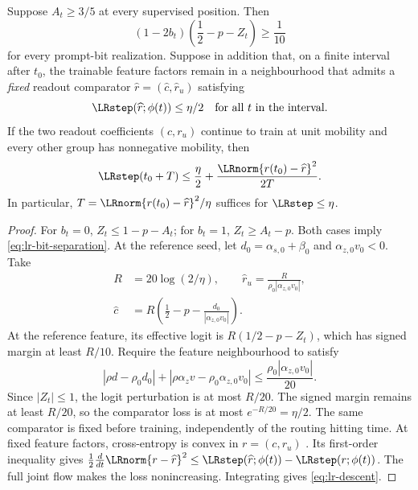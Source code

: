 \begin{lrlemma}
\label{lem:lr-readout-convergence}
Suppose $A_t\ge3/5$ at every supervised position.  Then
\begin{equation}\label{eq:lr-bit-separation}
 (1-2b_t)\left(\frac12-p-Z_t\right)\ge\frac1{10}
\end{equation}
for every prompt-bit realization.  Suppose in addition that, on a
finite interval after $t_0$, the trainable feature factors remain in a
neighbourhood that admits a \emph{fixed} readout comparator
$\widehat r=(\widehat c,\widehat r_u)$ satisfying
\begin{equation}\label{eq:lr-comparator}
 \LRstep(\widehat r;\phi(t))\le\eta/2
 \quad\text{for all }t\text{ in the interval}.
\end{equation}
If the two readout coefficients $(c,r_u)$ continue to train at unit
mobility and every other group has nonnegative mobility, then
\begin{equation}\label{eq:lr-descent}
 \LRstep(t_0+T)\le\frac\eta2+
 \frac{\LRnorm{r(t_0)-\widehat r}^2}{2T}.
\end{equation}
In particular, $T=\LRnorm{r(t_0)-\widehat r}^2/\eta$ suffices for
$\LRstep\le\eta$.
\end{lrlemma}
\begin{proof}
For $b_t=0$, $Z_t\le1-p-A_t$; for $b_t=1$,
$Z_t\ge A_t-p$.  Both cases imply
\eqref{eq:lr-bit-separation}.
At the reference seed, let $d_0=\alpha_{s,0}+\beta_0$ and $\alpha_{z,0}v_0<0$. Take
\[
 \begin{aligned}
 R&=20\log(2/\eta),\qquad \widehat r_u=\frac{R}{\rho_0|\alpha_{z,0}v_0|},\\
 \widehat c&=R\left(\frac12-p-\frac{d_0}{|\alpha_{z,0}v_0|}\right).
 \end{aligned}
\] 
At the reference feature, its effective logit is
$R(1/2-p-Z_t)$, which has signed margin at least $R/10$.
Require the feature neighbourhood to satisfy
\begin{equation}\label{eq:lr-comparator-stability}
 |\rho d-\rho_0d_0|+|\rho {\alpha_z v}-\rho_0{\alpha_{z,0}v_0}|
 \le\frac{\rho_0|{\alpha_{z,0}v_0}|}{20}.
\end{equation}
Since $|Z_t|\le1$, the logit perturbation is at most $R/20$.
The signed margin remains at least $R/20$, so the comparator loss is
at most $e^{-R/20}=\eta/2$. The same comparator is fixed before training,
independently of the routing hitting time.
At fixed feature factors, cross-entropy is convex in $r=(c,r_u)$ \citep[Section~3.1.5]{boyd2004convex}. Its first-order inequality \citep[Section~3.1.3]{boyd2004convex} gives
$\frac12\frac{d}{dt}\LRnorm{r-\widehat r}^2
\le\LRstep(\widehat r;\phi(t))-\LRstep(r;\phi(t))$.
The full joint flow makes the loss nonincreasing.  Integrating gives
\eqref{eq:lr-descent}.
\end{proof}

